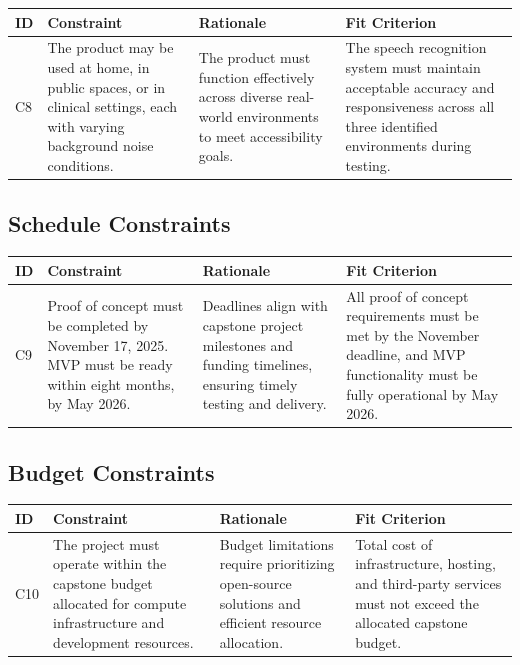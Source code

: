 \documentclass[12pt]{article}
\begin{document}
\begin{tabularx}{\textwidth}{p{1cm}X X X}
\toprule
\textbf{ID} & \textbf{Constraint} & \textbf{Rationale} & \textbf{Fit Criterion} \\
\midrule
C8 & The product may be used at home, in public spaces, or in clinical settings, each with varying background noise conditions. & The product must function effectively across diverse real-world environments to meet accessibility goals. & The speech recognition system must maintain acceptable accuracy and responsiveness across all three identified environments during testing. \\
\bottomrule
\end{tabularx}


\subsection{Schedule Constraints}


\begin{tabularx}{\textwidth}{p{1cm}X X X}

\toprule
\textbf{ID} & \textbf{Constraint} & \textbf{Rationale} & \textbf{Fit Criterion} \\
\midrule
C9 & Proof of concept must be completed by November 17, 2025. MVP must be ready within eight months, by May 2026. & Deadlines align with capstone project milestones and funding timelines, ensuring timely testing and delivery. & All proof of concept requirements must be met by the November deadline, and MVP functionality must be fully operational by May 2026. \\
\bottomrule
\end{tabularx}

\subsection{Budget Constraints}

\begin{tabularx}{\textwidth}{p{1cm}X X X}
\toprule
\textbf{ID} & \textbf{Constraint} & \textbf{Rationale} & \textbf{Fit Criterion} \\
\midrule
C10 & The project must operate within the capstone budget allocated for compute infrastructure and development resources. & Budget limitations require prioritizing open-source solutions and efficient resource allocation. & Total cost of infrastructure, hosting, and third-party services must not exceed the allocated capstone budget. \\
\bottomrule
\end{tabularx}
\end{document}
